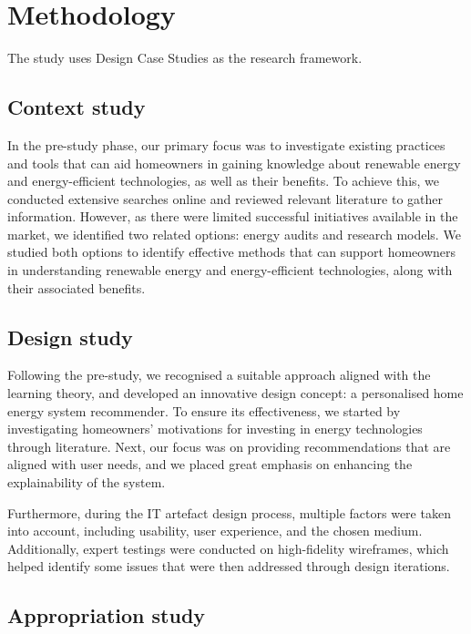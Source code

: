 \chapter{Methodology} 

The study uses Design Case Studies \cite{dcs} as the research framework. 


\section{Context study}

In the pre-study phase, 
our primary focus was to investigate existing practices and tools that can aid homeowners in gaining knowledge about renewable energy and energy-efficient technologies, as well as their benefits. 
To achieve this, we conducted extensive searches online and reviewed relevant literature to gather information. 
However, as there were limited successful initiatives available in the market, we identified two related options: energy audits and research models. 
We studied both options to identify effective methods that can support homeowners in understanding renewable energy and energy-efficient technologies, along with their associated benefits.


\section{Design study}

Following the pre-study, 
we recognised a suitable approach aligned with the learning theory, 
and developed an innovative design concept: a personalised home energy system recommender.
To ensure its effectiveness, 
we started by investigating homeowners' motivations for investing in energy technologies through literature. 
Next, our focus was on providing recommendations that are aligned with user needs, 
and we placed great emphasis on enhancing the explainability of the system.

Furthermore, during the IT artefact design process, 
multiple factors were taken into account, including usability, user experience, and the chosen medium. 
Additionally, expert testings were conducted on high-fidelity wireframes, 
which helped identify some issues that were then addressed through design iterations. 


\section{Appropriation study}

